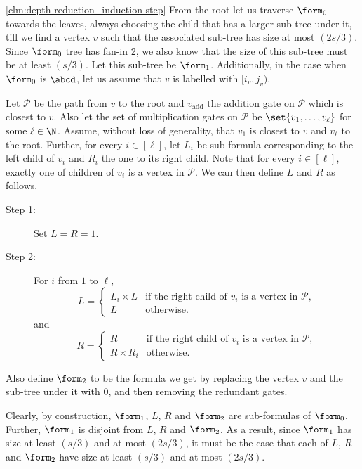 \begin{proofof}{\autoref{clm:depth-reduction_induction-step}}
%
	From the root let us traverse $\form_0$ towards the leaves, always choosing the child that has a larger sub-tree under it, till we find a vertex $v$ such that the associated sub-tree has size at most $(2s/3)$. 
	Since $\form_0$ tree has fan-in 2, we also know that the size of this sub-tree must be at least $(s/3)$. 
	Let this sub-tree be $\form_1$. 
	Additionally, in the case when $\form_0$ is $\abcd$, let us assume that $v$ is labelled with $[i_v,j_v)$.
	
	Let $\mathcal{P}$ be the path from $v$ to the root and $v_{\text{add}}$ the addition gate on $\mathcal{P}$ which is closest to $v$.
	Also let the set of multiplication gates on $\mathcal{P}$ be $\set{v_1, \ldots, v_\ell}$ for some $\ell \in \N$.
	Assume, without loss of generality, that $v_1$ is closest to $v$ and $v_\ell$ to the root.
	Further, for every $i \in [\ell]$, let $L_i$ be sub-formula corresponding to the left child of $v_i$ and $R_i$ the one to its right child.
	Note that for every $i \in [\ell]$, exactly one of children of $v_i$ is a vertex in $\mathcal{P}$.
	We can then define $L$ and $R$ as follows.
	\begin{description}
		\item[Step 1:] Set $L = R = 1$.
		\item[Step 2:] For $i$ from $1$ to $\ell$,
		    \[
		        L =
		        \begin{cases}
                   	L_i \times L & \text{if the right child of $v_i$ is a vertex in $\mathcal{P}$,}\\
                  	L & \text{otherwise.}
                \end{cases}
            \]
            and
            \[
            	R = 
            	\begin{cases}
                   	R & \text{if the right child of $v_i$ is a vertex in $\mathcal{P}$,}\\
                  	R \times R_i & \text{otherwise.}
                \end{cases}
            \]
	\end{description}
	
	\noindent Also define $\form_2$ to be the formula we get by replacing the vertex $v$ and the sub-tree under it with $0$, and then removing the redundant gates.
		
	Clearly, by construction, $\form_1$, $L$, $R$ and $\form_2$ are sub-formulas of $\form_0$.
	Further, $\form_1$ is disjoint from $L$, $R$ and $\form_2$. 
	As a result, since $\form_1$ has size at least $(s/3)$ and at most $(2s/3)$, it must be the case that each of $L$, $R$ and $\form_2$ have size at least $(s/3)$ and at most $(2s/3)$.


\end{proofof}
